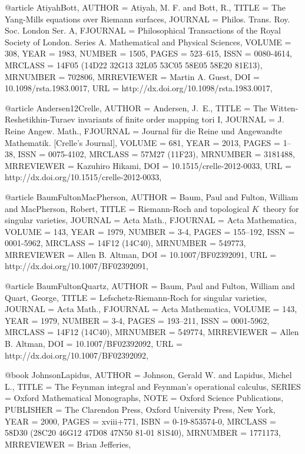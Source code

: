 @article {AtiyahBott,
    AUTHOR = {Atiyah, M. F. and Bott, R.},
     TITLE = {The {Y}ang-{M}ills equations over {R}iemann surfaces},
   JOURNAL = {Philos. Trans. Roy. Soc. London Ser. A},
  FJOURNAL = {Philosophical Transactions of the Royal Society of London.
              Series A. Mathematical and Physical Sciences},
    VOLUME = {308},
      YEAR = {1983},
    NUMBER = {1505},
     PAGES = {523--615},
      ISSN = {0080-4614},
   MRCLASS = {14F05 (14D22 32G13 32L05 53C05 58E05 58E20 81E13)},
  MRNUMBER = {702806},
MRREVIEWER = {Martin A. Guest},
       DOI = {10.1098/rsta.1983.0017},
       URL = {http://dx.doi.org/10.1098/rsta.1983.0017},
}

@article {Andersen12Crelle,
    AUTHOR = {Andersen, J.~E.},
     TITLE = {The {W}itten-{R}eshetikhin-{T}uraev invariants of finite order
              mapping tori {I}},
   JOURNAL = {J. Reine Angew. Math.},
  FJOURNAL = {Journal f\"ur die Reine und Angewandte Mathematik. [Crelle's
              Journal]},
    VOLUME = {681},
      YEAR = {2013},
     PAGES = {1--38},
      ISSN = {0075-4102},
   MRCLASS = {57M27 (11F23)},
  MRNUMBER = {3181488},
MRREVIEWER = {Kazuhiro Hikami},
       DOI = {10.1515/crelle-2012-0033},
       URL = {http://dx.doi.org/10.1515/crelle-2012-0033},
}

@article {BaumFultonMacPherson,
    AUTHOR = {Baum, Paul and Fulton, William and MacPherson, Robert},
     TITLE = {Riemann-{R}och and topological {$K$}\ theory for singular
              varieties},
   JOURNAL = {Acta Math.},
  FJOURNAL = {Acta Mathematica},
    VOLUME = {143},
      YEAR = {1979},
    NUMBER = {3-4},
     PAGES = {155--192},
      ISSN = {0001-5962},
   MRCLASS = {14F12 (14C40)},
  MRNUMBER = {549773},
MRREVIEWER = {Allen B. Altman},
       DOI = {10.1007/BF02392091},
       URL = {http://dx.doi.org/10.1007/BF02392091},
}

@article {BaumFultonQuartz,
    AUTHOR = {Baum, Paul and Fulton, William and Quart, George},
     TITLE = {Lefschetz-{R}iemann-{R}och for singular varieties},
   JOURNAL = {Acta Math.},
  FJOURNAL = {Acta Mathematica},
    VOLUME = {143},
      YEAR = {1979},
    NUMBER = {3-4},
     PAGES = {193--211},
      ISSN = {0001-5962},
   MRCLASS = {14F12 (14C40)},
  MRNUMBER = {549774},
MRREVIEWER = {Allen B. Altman},
       DOI = {10.1007/BF02392092},
       URL = {http://dx.doi.org/10.1007/BF02392092},
}

@book {JohnsonLapidus,
    AUTHOR = {Johnson, Gerald W. and Lapidus, Michel L.},
     TITLE = {The {F}eynman integral and {F}eynman's operational calculus},
    SERIES = {Oxford Mathematical Monographs},
      NOTE = {Oxford Science Publications},
 PUBLISHER = {The Clarendon Press, Oxford University Press, New York},
      YEAR = {2000},
     PAGES = {xviii+771},
      ISBN = {0-19-853574-0},
   MRCLASS = {58D30 (28C20 46G12 47D08 47N50 81-01 81S40)},
  MRNUMBER = {1771173},
MRREVIEWER = {Brian Jefferies},
}



